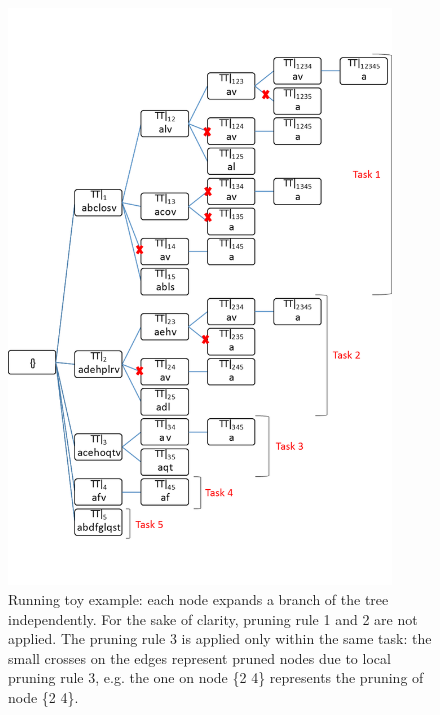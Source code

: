 \begin{figure}[!t]
\includegraphics[width=4in]{chapters/pampa/running_example2_d.png}
\caption{Running toy example: each node expands a branch of the tree
independently. For the sake of clarity, pruning rule 1 and 2 are not applied. The pruning rule 3 is
applied only within the same task: the small crosses on the edges represent pruned
nodes due to local pruning rule 3, e.g.
the one on node \{2 4\} represents the pruning of node \{2 4\}.}
\label{running_2}
\end{figure}


